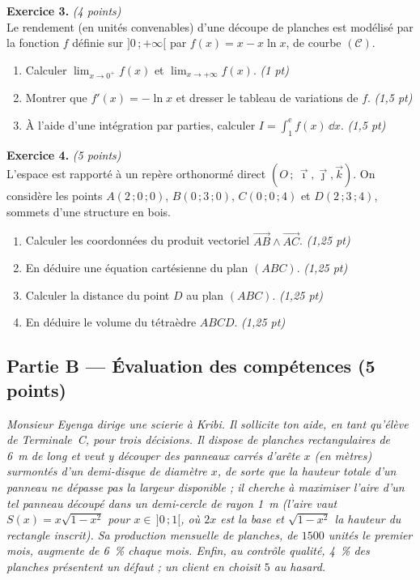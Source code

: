 \smallskip
\noindent\textbf{Exercice 3.} \hfill\textit{(4 points)}\\
Le rendement (en unités convenables) d'une découpe de planches est modélisé par la
fonction $f$ définie sur $]0\,;+\infty[$ par $f(x)=x-x\ln x$, de courbe $(\mathcal{C})$.
\begin{enumerate}[label=\arabic*)]
\item Calculer $\displaystyle\lim_{x\to 0^+}f(x)$ et $\displaystyle\lim_{x\to+\infty}f(x)$. \hfill\textit{(1 pt)}
\item Montrer que $f'(x)=-\ln x$ et dresser le tableau de variations de $f$. \hfill\textit{(1,5 pt)}
\item À l'aide d'une intégration par parties, calculer
$\displaystyle I=\int_1^{\mathrm{e}}f(x)\,\dd x$. \hfill\textit{(1,5 pt)}
\end{enumerate}

\smallskip
\noindent\textbf{Exercice 4.} \hfill\textit{(5 points)}\\
L'espace est rapporté à un repère orthonormé direct $(O\,;\,\vec\imath,\vec\jmath,\vec k)$.
On considère les points $A(2\,;0\,;0)$, $B(0\,;3\,;0)$, $C(0\,;0\,;4)$ et $D(2\,;3\,;4)$,
sommets d'une structure en bois.
\begin{enumerate}[label=\arabic*)]
\item Calculer les coordonnées du produit vectoriel $\vec{AB}\wedge\vec{AC}$. \hfill\textit{(1,25 pt)}
\item En déduire une équation cartésienne du plan $(ABC)$. \hfill\textit{(1,25 pt)}
\item Calculer la distance du point $D$ au plan $(ABC)$. \hfill\textit{(1,25 pt)}
\item En déduire le volume du tétraèdre $ABCD$. \hfill\textit{(1,25 pt)}
\end{enumerate}

\subsection*{Partie B — Évaluation des compétences \hfill (5 points)}

\noindent\textit{Monsieur Eyenga dirige une scierie à Kribi. Il sollicite ton aide,
en tant qu'élève de Terminale~C, pour trois décisions. Il dispose de planches
rectangulaires de \SI{6}{\metre} de long et veut y découper des panneaux carrés
d'arête $x$ (en mètres) surmontés d'un demi-disque de diamètre $x$, de sorte que la
hauteur totale d'un panneau ne dépasse pas la largeur disponible ; il cherche à
\emph{maximiser l'aire} d'un tel panneau découpé dans un demi-cercle de rayon
\SI{1}{\metre} (l'aire vaut $S(x)=x\sqrt{1-x^2}$ pour $x\in\,]0\,;1[$, où $2x$ est la
base et $\sqrt{1-x^2}$ la hauteur du rectangle inscrit). Sa production mensuelle de
planches, de $1500$ unités le premier mois, augmente de \SI{6}{\percent} chaque mois.
Enfin, au contrôle qualité, \SI{4}{\percent} des planches présentent un défaut ; un
client en choisit $5$ au hasard.}

